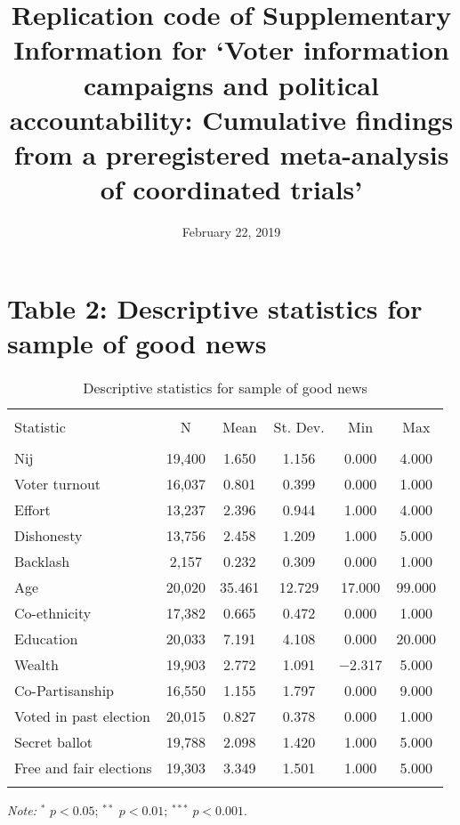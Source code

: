 \documentclass[]{article}
\title{Replication code of Supplementary Information for `Voter information
campaigns and political accountability: Cumulative findings from a
preregistered meta-analysis of coordinated trials'}
\author{}
\date{February 22, 2019}
\begin{document}
\maketitle

{
\setcounter{tocdepth}{3}
\tableofcontents
}
\section{Table 2: Descriptive statistics for sample of good
news}\label{table-2-descriptive-statistics-for-sample-of-good-news}

\begin{table}[htb] \centering 
  \caption{Descriptive statistics for sample of good news} 
  \label{} 
\begin{tabular}{@{\extracolsep{1pt}}lccccc} 
\\[-1.8ex]\hline 
\hline \\[-1.8ex] 
Statistic & \multicolumn{1}{c}{N} & \multicolumn{1}{c}{Mean} & \multicolumn{1}{c}{St. Dev.} & \multicolumn{1}{c}{Min} & \multicolumn{1}{c}{Max} \\ 
\hline \\[-1.8ex] 
Nij & 19,400 & 1.650 & 1.156 & 0.000 & 4.000 \\ 
Voter turnout & 16,037 & 0.801 & 0.399 & 0.000 & 1.000 \\ 
Effort & 13,237 & 2.396 & 0.944 & 1.000 & 4.000 \\ 
Dishonesty & 13,756 & 2.458 & 1.209 & 1.000 & 5.000 \\ 
Backlash & 2,157 & 0.232 & 0.309 & 0.000 & 1.000 \\ 
Age & 20,020 & 35.461 & 12.729 & 17.000 & 99.000 \\ 
Co-ethnicity & 17,382 & 0.665 & 0.472 & 0.000 & 1.000 \\ 
Education & 20,033 & 7.191 & 4.108 & 0.000 & 20.000 \\ 
Wealth & 19,903 & 2.772 & 1.091 & $-$2.317 & 5.000 \\ 
Co-Partisanship & 16,550 & 1.155 & 1.797 & 0.000 & 9.000 \\ 
Voted in past election & 20,015 & 0.827 & 0.378 & 0.000 & 1.000 \\ 
Secret ballot & 19,788 & 2.098 & 1.420 & 1.000 & 5.000 \\ 
Free and fair elections & 19,303 & 3.349 & 1.501 & 1.000 & 5.000 \\ 
\hline \\[-1.8ex] 
\end{tabular} 
\begin{flushleft}\textit{Note:}  $^*$ $p<0.05$; $^{**}$ $p<0.01$; $^{***}$ $p<0.001$. \end{flushleft}
\end{table}
\end{document}

